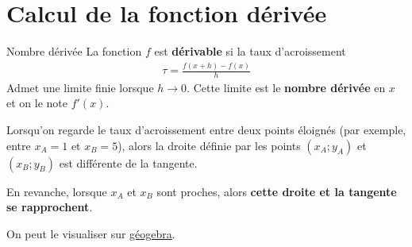 \documentclass[10pt,a4paper,openany,twoside, eleve]{book}
\begin{document}
\section{Calcul de la fonction dérivée}

\begin{defi}{Nombre dérivée}{}
  La fonction $f$ est \textbf{dérivable} si la taux d'acroissement
  \begin{align*}
    \tau = \frac{f(x+h)-f(x)}{h}
  \end{align*}
  Admet une limite finie lorsque $h\rightarrow 0$. Cette limite est le \textbf{nombre dérivée} en $x$ et on le note $f'(x)$.
\end{defi}

\begin{rem}{}{}
  Lorsqu'on regarde le taux d'acroissement entre deux points éloignés (par exemple, entre $x_A=1$ et $x_B=5$), alors la droite définie par les points $(x_A;y_A)$ et $(x_B;y_B)$ est différente de la tangente.

  En revanche, lorsque $x_A$ et $x_B$ sont proches, alors \textbf{cette droite et la tangente se rapprochent}.

  On peut le visualiser sur \href{https://www.geogebra.org/m/an6GkSqT}{géogebra}.
\end{rem}
\end{document}
